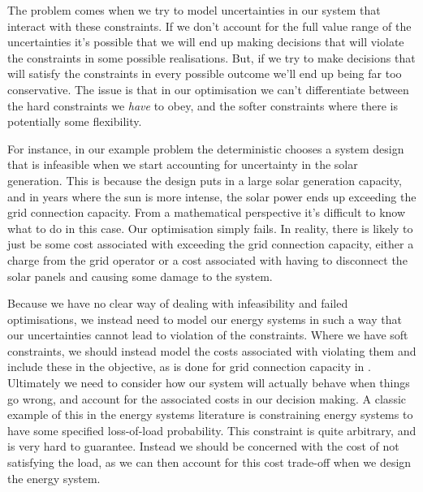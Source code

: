\begin{subappendices}
The problem comes when we try to model uncertainties in our system that interact with these constraints. If we don't account for the full value range of the uncertainties it's possible that we will end up making decisions that will violate the constraints in some possible realisations. But, if we try to make decisions that will satisfy the constraints in every possible outcome we'll end up being far too conservative. The issue is that in our optimisation we can't differentiate between the hard constraints we \textit{have} to obey, and the softer constraints where there is potentially some flexibility.

For instance, in our example problem the deterministic  chooses a system design that is infeasible when we start accounting for uncertainty in the solar generation. This is because the design puts in a large solar generation capacity, and in years where the sun is more intense, the solar power ends up exceeding the grid connection capacity. From a mathematical perspective it's difficult to know what to do in this case. Our optimisation simply fails. In reality, there is likely to just be some cost associated with exceeding the grid connection capacity, either a charge from the grid operator \citep{frontiereconomics2022NetworkTariffsEnergy} or a cost associated with having to disconnect the solar panels and causing some damage to the system.

Because we have no clear way of dealing with infeasibility and failed optimisations, we instead need to model our energy systems in such a way that our uncertainties cannot lead to violation of the constraints. Where we have soft constraints, we should instead model the costs associated with violating them and include these in the objective, as is done for grid connection capacity in . Ultimately we need to consider how our system will actually behave when things go wrong, and account for the associated costs in our decision making. A classic example of this in the energy systems literature is constraining energy systems to have some specified loss-of-load probability. This constraint is quite arbitrary, and is very hard to guarantee. Instead we should be concerned with the cost of not satisfying the load, as we can then account for this cost trade-off when we design the energy system.

\end{subappendices}